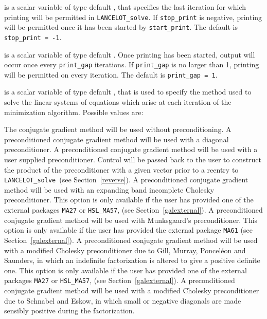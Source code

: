 \documentclass{galahad}
\newcommand{\fullpackagename}{LANC\-E\-LOT}
\newcommand{\solver}{{\tt \fullpackagename\_solve}}
\begin{document}
\begin{description}
 is a scalar variable of type default \integer, that specifies
the last iteration for which printing will be permitted in  \solver.
If {\tt stop\_print} is negative, printing will be permitted once it has been
started by {\tt start\_print}.
The default is {\tt stop\_print = -1}.

 is a scalar variable of type default \integer.
Once printing has been started, output will occur once every
{\tt print\_gap} iterations. If {\tt print\_gap} is no larger than 1,
printing will be permitted on every iteration.
The default is {\tt print\_gap = 1}.

 is a scalar variable of type default \integer, that
is used to specify the method used to solve the linear systems of equations
which arise at each iteration of the minimization algorithm.
 Possible values are:
\begin{description}
    The conjugate gradient method will be used without preconditioning.
    A preconditioned conjugate gradient
    method will be used with a diagonal
    preconditioner.
    A preconditioned conjugate gradient
    method will be used with a user supplied
    preconditioner. Control will be passed back to the user to
    construct the product of the preconditioner with a given
    vector prior to a reentry to \solver\
    (see Section~\ref{reverse}).
    A preconditioned conjugate gradient
    method will be used with an expanding band
    incomplete Cholesky preconditioner.
    This option is only available if the user has provided one of the
    external packages {\tt MA27} or {\tt HSL\_MA57},
    (see Section~\ref{galexternal}).
    A preconditioned conjugate gradient
    method will be used with Munksgaard's
    preconditioner.
    This option is only available if the user has provided the
    external package {\tt MA61}
    (see Section~\ref{galexternal}).
    A preconditioned conjugate gradient
    method will be used with a modified Cholesky
    preconditioner due to Gill, Murray, Poncel\'{e}on and Saunders,
    in which an indefinite factorization is altered to give a positive 
    definite one.
    This option is only available if the user has provided one of the
    external packages {\tt MA27} or {\tt HSL\_MA57},
    (see Section~\ref{galexternal}).
    A preconditioned conjugate gradient
    method will be used with a modified Cholesky
    preconditioner due to Schnabel and Eskow, 
    in which small or negative diagonals are
    made sensibly positive during the factorization. 

\end{description}
\end{description}
\end{document}
